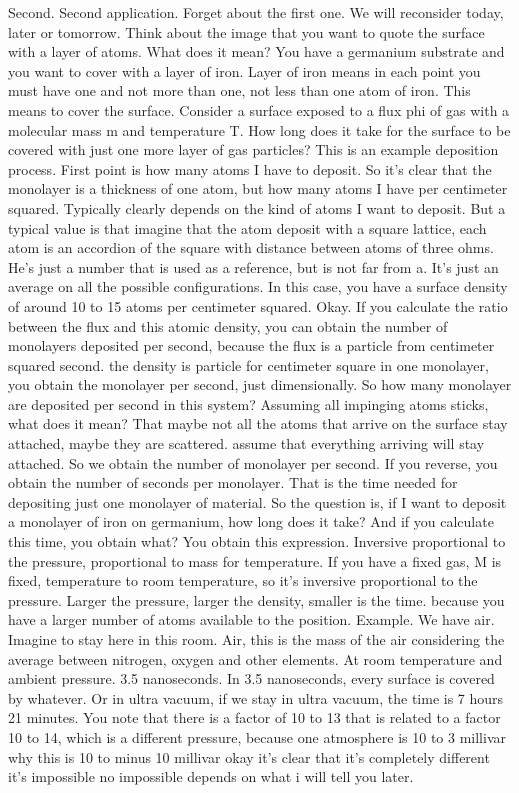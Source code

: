 Second. Second application. Forget about the first one. We will reconsider today, later or tomorrow. Think about the image that you want to quote the surface with a layer of atoms. What does it mean? You have a germanium substrate and you want to cover with a layer of iron. Layer of iron means in each point you must have one and not more than one, not less than one atom of iron. This means to cover the surface. Consider a surface exposed to a flux phi of gas with a molecular mass m and temperature T. How long does it take for the surface to be covered with just one more layer of gas particles? This is an example deposition process. First point is how many atoms I have to deposit. So it's clear that the monolayer is a thickness of one atom, but how many atoms I have per centimeter squared. Typically clearly depends on the kind of atoms I want to deposit. But a typical value is that imagine that the atom deposit with a square lattice, each atom is an accordion of the square with distance between atoms of three ohms. He's just a number that is used as a reference, but is not far from a. It's just an average on all the possible configurations. In this case, you have a surface density of around 10 to 15 atoms per centimeter squared. Okay. If you calculate the ratio between the flux and this atomic density, you can obtain the number of monolayers deposited per second, because the flux is a particle from centimeter squared second. the density is particle for centimeter square in one monolayer, you obtain the monolayer per second, just dimensionally. So how many monolayer are deposited per second in this system? Assuming all impinging atoms sticks, what does it mean? That maybe not all the atoms that arrive on the surface stay attached, maybe they are scattered. assume that everything arriving will stay attached. So we obtain the number of monolayer per second. If you reverse, you obtain the number of seconds per monolayer. That is the time needed for depositing just one monolayer of material. So the question is, if I want to deposit a monolayer of iron on germanium, how long does it take? And if you calculate this time, you obtain what? You obtain this expression. Inversive proportional to the pressure, proportional to mass for temperature. If you have a fixed gas, M is fixed, temperature to room temperature, so it's inversive proportional to the pressure. Larger the pressure, larger the density, smaller is the time. because you have a larger number of atoms available to the position. Example. We have air. Imagine to stay here in this room. Air, this is the mass of the air considering the average between nitrogen, oxygen and other elements. At room temperature and ambient pressure. 3.5 nanoseconds. In 3.5 nanoseconds, every surface is covered by whatever. Or in ultra vacuum, if we stay in ultra vacuum, the time is 7 hours 21 minutes. You note that there is a factor of 10 to 13 that is related to a factor 10 to 14, which is a different pressure, because one atmosphere is 10 to 3 millivar why this is 10 to minus 10 millivar okay it's clear that it's completely different it's impossible no impossible depends on what i will tell you later.
